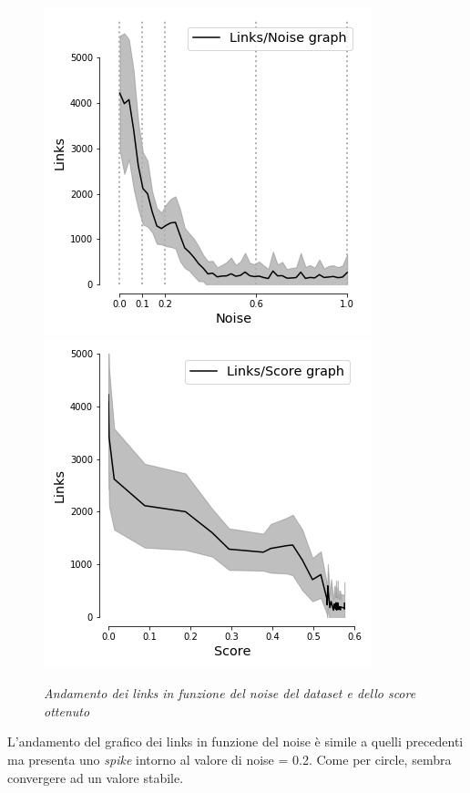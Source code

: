 \documentclass[12pt,a4paper]{report}
\begin{document}
\begin{figure}[H]
 \centering
 \includegraphics[scale = 0.5]{images/links_noise_circles+}
 \includegraphics[scale = 0.5]{images/Links_Score_circles+}
 \caption{\textit{Andamento dei links in funzione del noise del dataset e dello score ottenuto  }}
 \label{links-score-circle+}
\end{figure}

L'andamento del grafico dei links in funzione del noise è simile a quelli precedenti ma presenta uno \textit{spike} intorno al valore di noise =  0.2. Come per circle, sembra convergere ad un valore stabile.
\end{document}
